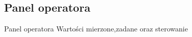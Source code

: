 \subsection{Panel operatora}
\label{lab:zad5}


\ifdefined\CompileFigures
%    
\fi

Panel	operatora
Wartości	mierzone,zadane	oraz	sterowanie

\newpage
